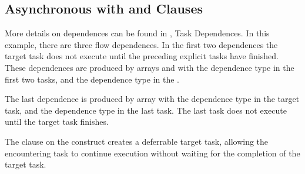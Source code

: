 \subsection{Asynchronous  with  and  Clauses}
\label{subsec:async_target_nowait_depend}

More details on dependences can be found in , Task 
Dependences. In this example, there are three flow dependences.  In the first two dependences the
target task does not execute until the preceding explicit tasks have finished.   These 
dependences are produced by arrays  and   with the  dependence type in the first two tasks, and the  dependence type in the .   

The last dependence is produced by array   with the  dependence type in the target task, and the  dependence type in the last task.  The last task does not execute until the target task finishes.  

The  clause on the  construct creates a deferrable target task, allowing the encountering task to continue execution without waiting for the completion of the target task.



